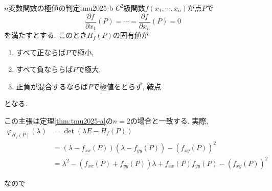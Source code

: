 \documentclass[titlepage]{jsarticle}
\numberwithin{equation}{section}
\begin{document}
\begin{thm}{$n$変数関数の極値の判定}{tmu2025-b}
$C^2$級関数$f(x_1, \cdots, x_n)$が点$P$で
\[
\dfrac{\partial f}{\partial x_1}(P) = \cdots = \dfrac{\partial f}{\partial x_n}(P) = 0
\]
を満たすとする. このとき$H_f(P)$の固有値が
\begin{enumerate}
\item[(1)] すべて正ならば$P$で極小,
\item[(2)] すべて負なららば$P$で極大,
\item[(3)] 正負が混合するならば$P$で極値をとらず, 鞍点
\end{enumerate}
となる.
\end{thm}
この主張は定理\ref{thm:tmu2025-a}の$n=2$の場合と一致する. 実際,
\begin{align*}
\varphi_{H_f(P)}(\lambda) &= \det (\lambda E - H_f(P))\\
                           & = (\lambda - f_{xx}(P))(\lambda - f_{yy}(P)) - (f_{xy}(P))^2\\
			 & = \lambda^2 - (f_{xx}(P)+f_{yy}(P))\lambda + f_{xx}(P)f_{yy}(P) - (f_{xy}(P))^2
\end{align*}

なので
\end{document}
